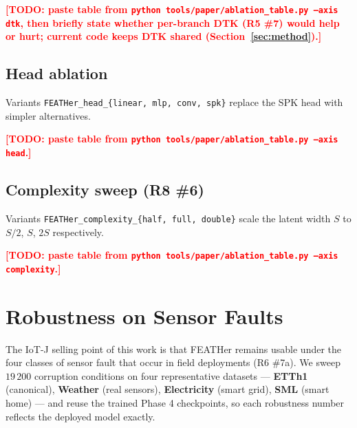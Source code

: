\documentclass[journal]{IEEEtran}
\theoremstyle{remark}
\newcommand{\TODO}[1]{\textcolor{red}{\textbf{[TODO: #1]}}}
\begin{document}
\TODO{paste table from \texttt{python tools/paper/ablation\_table.py --axis dtk}, then briefly state whether per-branch DTK (R5 \#7) would help or hurt; current code keeps DTK shared (Section~\ref{sec:method}).}

\subsection{Head ablation}
Variants \texttt{FEATHer\_head\_\{linear, mlp, conv, spk\}}
replace the SPK head with simpler alternatives.

\TODO{paste table from \texttt{python tools/paper/ablation\_table.py --axis head}.}

\subsection{Complexity sweep (R8 \#6)}
Variants \texttt{FEATHer\_complexity\_\{half, full, double\}}
scale the latent width $S$ to $S/2$, $S$, $2S$ respectively.

\TODO{paste table from \texttt{python tools/paper/ablation\_table.py --axis complexity}.}

\section{Robustness on Sensor Faults}
\label{sec:robustness}

The IoT-J selling point of this work is that FEATHer remains usable
under the four classes of sensor fault that occur in field
deployments (R6 \#7a). We sweep $19\,200$ corruption conditions on
four representative datasets ---
\textbf{ETTh1} (canonical), \textbf{Weather} (real sensors),
\textbf{Electricity} (smart grid), \textbf{SML} (smart home) ---
and reuse the trained Phase 4 checkpoints, so each robustness number
reflects the deployed model exactly.
\end{document}
